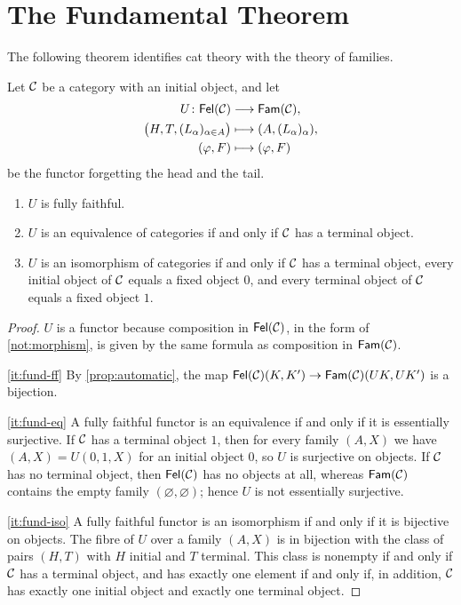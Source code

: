 \section{The Fundamental Theorem}\label{sec:fundamental}

The following theorem identifies cat theory with the theory of families.

\begin{theorem}\label{thm:fundamental}
Let $\mathcal{C}$ be a category with an initial object, and let
\[
\begin{aligned}
U\colon\mathsf{Fel}(\mathcal{C})&\longrightarrow\mathsf{Fam}(\mathcal{C}),\\
\bigl(H,T,(L_\alpha)_{\alpha\in A}\bigr)&\longmapsto(A,(L_\alpha)_\alpha),\\
(\varphi,F)&\longmapsto(\varphi,F)
\end{aligned}
\]
be the functor forgetting the head and the tail.
\begin{enumerate}
\item\label{it:fund-ff} $U$ is fully faithful.
\item\label{it:fund-eq} $U$ is an equivalence of categories if and only if
  $\mathcal{C}$ has a terminal object.
\item\label{it:fund-iso} $U$ is an isomorphism of categories if and only if
  $\mathcal{C}$ has a terminal object, every initial object of $\mathcal{C}$ equals a fixed
  object $0$, and every terminal object of $\mathcal{C}$ equals a fixed object $1$.
\end{enumerate}
\end{theorem}

\begin{proof}
$U$ is a functor because composition in $\mathsf{Fel}(\mathcal{C})$, in the form of
\cref{not:morphism}, is given by the same formula as composition in
$\mathsf{Fam}(\mathcal{C})$.

\ref{it:fund-ff} By \cref{prop:automatic}, the map
$\mathsf{Fel}(\mathcal{C})(K,K')\to\mathsf{Fam}(\mathcal{C})(UK,UK')$ is a bijection.

\ref{it:fund-eq} A fully faithful functor is an equivalence if and only if it
is essentially surjective. If $\mathcal{C}$ has a terminal object $1$, then for every
family $(A,X)$ we have $(A,X)=U(0,1,X)$ for an initial object $0$, so $U$ is
surjective on objects. If $\mathcal{C}$ has no terminal object, then $\mathsf{Fel}(\mathcal{C})$ has
no objects at all, whereas $\mathsf{Fam}(\mathcal{C})$ contains the empty family
$(\varnothing,\varnothing)$; hence $U$ is not essentially surjective.

\ref{it:fund-iso} A fully faithful functor is an isomorphism if and only if it
is bijective on objects. The fibre of $U$ over a family $(A,X)$ is in
bijection with the class of pairs $(H,T)$ with $H$ initial and $T$ terminal.
This class is nonempty if and only if $\mathcal{C}$ has a terminal object, and has
exactly one element if and only if, in addition, $\mathcal{C}$ has exactly one initial
object and exactly one terminal object.
\end{proof}

